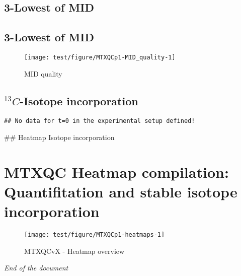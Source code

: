 \documentclass[9pt,]{article}
\begin{document}
\subsection{3-Lowest of MID}\label{lowest-of-mid}

\subsection{3-Lowest of MID}\label{lowest-of-mid-1}

\begin{figure}

{\centering \texttt{[image: test/figure/MTXQCp1-MID\_quality-1]} 

}

\caption{MID quality}\label{fig:MID_quality}
\end{figure}

\subsection{\texorpdfstring{\(^{13}C\)-Isotope
incorporation}{\^{}\{13\}C-Isotope incorporation}}\label{c-isotope-incorporation}

\begin{verbatim}
## No data for t=0 in the experimental setup defined!
\end{verbatim}

\clearpage
\#\# Heatmap Isotope incorporation

\section{MTXQC Heatmap compilation: Quantifitation and stable isotope
incorporation}\label{mtxqc-heatmap-compilation-quantifitation-and-stable-isotope-incorporation}

\begin{figure}

{\centering \texttt{[image: test/figure/MTXQCp1-heatmaps-1]} 

}

\caption{MTXQCvX - Heatmap overview}\label{fig:heatmaps}
\end{figure}

\emph{End of the document}
\newpage
\singlespacing 
\end{document}

